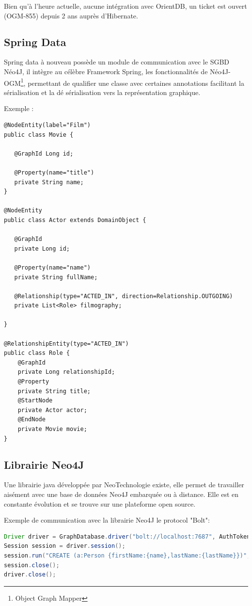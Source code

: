 \documentclass[a4paper,fleqn,12pt]{report}
\begin{document}
Bien qu'à l'heure actuelle, aucune intégration avec OrientDB, un ticket est ouvert (OGM-855) depuis 2 ans auprès d'Hibernate.

\subsection{Spring Data}

Spring data à nouveau possède un module de communication avec le SGBD Néo4J, il intègre au célèbre Framework Spring, les fonctionnalités de Néo4J-OGM\footnote{Object Graph Mapper}, permettant de qualifier une classe avec certaines annotations facilitant la sérialisation et la dé sérialisation vers la représentation graphique.

Exemple : 

\begin{lstlisting}
@NodeEntity(label="Film")
public class Movie {

   @GraphId Long id;

   @Property(name="title")
   private String name;
}

@NodeEntity
public class Actor extends DomainObject {

   @GraphId
   private Long id;

   @Property(name="name")
   private String fullName;

   @Relationship(type="ACTED_IN", direction=Relationship.OUTGOING)
   private List<Role> filmography;

}

@RelationshipEntity(type="ACTED_IN")
public class Role {
    @GraphId   
    private Long relationshipId;
    @Property  
    private String title;
    @StartNode 
    private Actor actor;
    @EndNode   
    private Movie movie;
}
\end{lstlisting}

\subsection{Librairie Neo4J}

Une librairie java développée par NeoTechnologie existe, elle permet de travailler aisément avec une base de données Neo4J embarquée ou à distance. Elle est en constante évolution et se trouve sur une plateforme open source. 

Exemple de communication avec la librairie Neo4J le protocol "Bolt":

\begin{lstlisting}[language=java]
Driver driver = GraphDatabase.driver("bolt://localhost:7687", AuthTokens.basic("matrix", "neo"));
Session session = driver.session();
session.run("CREATE (a:Person {firstName:{name},lastName:{lastName}})", parameters("firstName","Gilles","lastName","Bodart"));
session.close();
driver.close();

\end{lstlisting}
\end{document}
